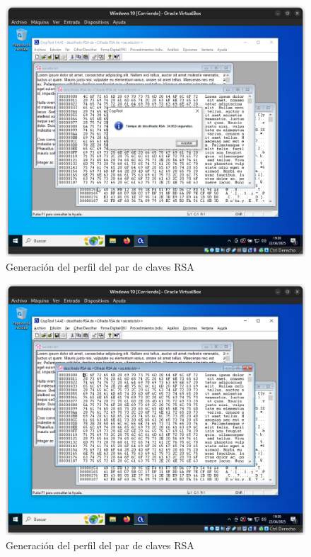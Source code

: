 \begin{figure}[h]
    \includegraphics[width=15cm]{DesencriptadoRSA-1}
    \caption{Generación del perfil del par de claves RSA}
\end{figure}

\begin{figure}[h]
    \includegraphics[width=15cm]{DesencriptadoRSA-2}
    \caption{Generación del perfil del par de claves RSA}
\end{figure}

